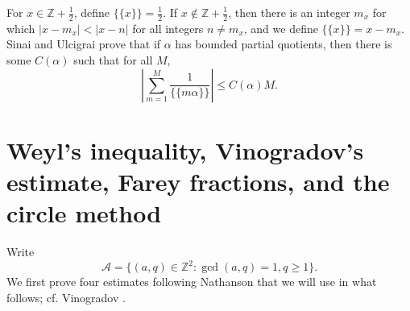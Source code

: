 \documentclass{article}
\begin{document}
For $x \in \mathbb{Z}+\frac{1}{2}$, define $\{\{x\}\}=\frac{1}{2}$. If $x \not \in \mathbb{Z}+\frac{1}{2}$, then there is 
an integer $m_x$ for which $|x-m_x| < |x-n|$ for all integers $n \neq m_x$, and we define $\{\{x\}\}=x-m_x$. 
Sinai and Ulcigrai \cite[p.~96, Proposition 2]{fixed} prove that if $\alpha$ has bounded partial quotients, then there is some
$C(\alpha)$ such that for all $M$,
\[
\left| \sum_{m=1}^M \frac{1}{\{\{m\alpha\}\}} \right| \leq C(\alpha)M.
\]






\section{Weyl's inequality, Vinogradov's estimate, Farey fractions, and the circle method}
Write
\[
\mathscr{A} = \{(a,q) \in \mathbb{Z}^2: \gcd(a,q)=1, q \geq 1\}.
\]
We first prove four estimates following Nathanson  \cite[pp.~104--110, Lemmas 4.8--4.11]{nathanson} that we will use in what follows; cf. Vinogradov \cite[p.~26, Chapter I,
Lemma 8b]{vinogradov}.
\end{document}
